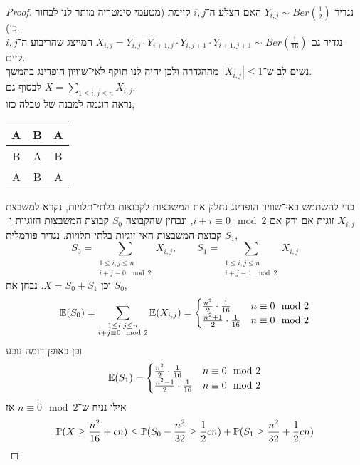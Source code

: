 \begin{proof}
	נגדיר $Y_{i, j} \sim Ber(\frac{1}{2})$ האם הצלע ה־$i, j$ קיימת (מטעמי סימטריה מותר לנו לבחור כן). \\
	נגדיר גם $X_{i, j} = Y_{i, j} \cdot Y_{i + 1, j} \cdot Y_{i, j + 1} \cdot Y_{i + 1, j + 1} \sim Ber(\frac{1}{16})$ המייצג שהריבוע ה־$i, j$ קיים. \\
	נשים לב ש־$|X_{i, j}| \le 1$ מההגדרה ולכן יהיה לנו תוקף לאי־שוויון הופדינג בהמשך. \\
	לבסוף גם $X = \sum_{1 \le i, j \le n} X_{i, j}$. \\
	נראה דוגמה למבנה של טבלה כזו,
	\begin{center}
		\begin{tabular}{|c | c | c |}
			\hline
			A & B & A \\
			\hline
			B & A & B \\
			\hline
			A & B & A \\
			\hline
		\end{tabular}
	\end{center}
	כדי להשתמש באי־שוויון הופדינג נחלק את המשבצות לקבוצות בלתי־תלויות, נקרא למשבצת $X_{i, j}$ זוגית אם ורק אם $i + i \equiv 0 \mod 2$, ונבחין שהקבוצה $S_0$ קבוצת המשבצות הזוגיות ו־$S_1$ קבוצת המשבצות האי־זוגיות בלתי־תלויות.
	נגדיר פורמלית,
	\[
		S_0 = \sum_{\substack{1 \le i, j \le n \\ i + j \equiv 0 \mod 2}} X_{i, j},
		\qquad
		S_1 = \sum_{\substack{1 \le i, j \le n \\ i + j \equiv 1 \mod 2}} X_{i, j}
	\]
	וכן $X = S_0 + S_1$.
	נבחן את $S_0$,
	\[
		\mathbb{E}(S_0)
		= \sum_{\substack{1 \le i, j \le n \\ i + j \equiv 0 \mod 2}} \mathbb{E}(X_{i, j})
		= \begin{cases}
			\frac{n^2}{2} \cdot \frac{1}{16} & n \equiv 0 \mod 2 \\
			\frac{n^2 + 1}{2} \cdot \frac{1}{16} & n \equiv 0 \mod 2 \\
		\end{cases}
	\]
	וכן באופן דומה נובע
	\[
		\mathbb{E}(S_1)
		= \begin{cases}
			\frac{n^2}{2} \cdot \frac{1}{16} & n \equiv 0 \mod 2 \\
			\frac{n^2 - 1}{2} \cdot \frac{1}{16} & n \equiv 0 \mod 2 \\
		\end{cases}
	\]
	אילו נניח ש־$n \equiv 0 \mod 2$ אז
	\begin{align*}
		\PP(X \ge \frac{n^2}{16} + cn)
		& \le \PP(S_0 - \frac{n^2}{32} \ge \frac{1}{2} cn) + \PP(S_1 \ge \frac{n^2}{32} + \frac{1}{2} cn) \\

\end{align*}
\end{proof}
